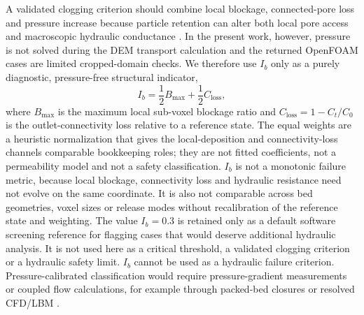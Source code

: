 \documentclass[preprint,12pt,authoryear]{elsarticle}
\newcommand{\Ib}{$I_b$\xspace}
\begin{document}
A validated clogging criterion should combine local blockage, connected-pore loss and pressure increase because particle retention can alter both local pore access and macroscopic hydraulic conductance \citep{Mays2005Clogging,Parvan2020Clogging}. In the present work, however, pressure is not solved during the DEM transport calculation and the returned OpenFOAM cases are limited cropped-domain checks. We therefore use \Ib only as a purely diagnostic, pressure-free structural indicator,
\begin{equation}
I_b = \frac{1}{2}B_{\max} + \frac{1}{2}C_{\mathrm{loss}},
\end{equation}
where $B_{\max}$ is the maximum local sub-voxel blockage ratio and $C_{\mathrm{loss}} = 1 - C_t/C_0$ is the outlet-connectivity loss relative to a reference state. The equal weights are a heuristic normalization that gives the local-deposition and connectivity-loss channels comparable bookkeeping roles; they are not fitted coefficients, not a permeability model and not a safety classification. \Ib is not a monotonic failure metric, because local blockage, connectivity loss and hydraulic resistance need not evolve on the same coordinate. It is also not comparable across bed geometries, voxel sizes or release modes without recalibration of the reference state and weighting. The value $I_b = 0.3$ is retained only as a default software screening reference for flagging cases that would deserve additional hydraulic analysis. It is not used here as a critical threshold, a validated clogging criterion or a hydraulic safety limit. \Ib cannot be used as a hydraulic failure criterion. Pressure-calibrated classification would require pressure-gradient measurements or coupled flow calculations, for example through packed-bed closures or resolved CFD/LBM \citep{Carman1937Permeability,Ergun1952PackedColumns,Wakao1982PackedBeds}.
\end{document}
